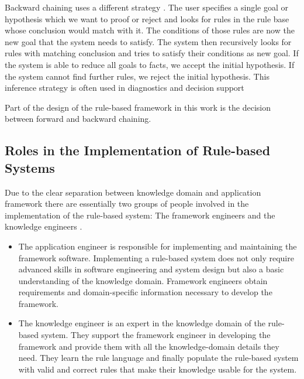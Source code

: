 Backward chaining uses a different strategy \cite{al2015comparison}.
The user specifies a single goal or hypothesis
which we want to proof or reject and looks for rules in the rule base whose conclusion would match with it.
The conditions of those rules are now the new goal that the system needs to satisfy.
The system then recursively looks for rules with matching conclusion
and tries to satisfy their conditions as new goal.
If the system is able to reduce all goals to facts, we accept the initial hypothesis.
If the system cannot find further rules, we reject the initial hypothesis.
This inference strategy is often used in diagnostics and decision support \cite{https://doi.org/10.1002/widm.11}

Part of the design of the rule-based framework in this work is the decision between forward and backward chaining.


\subsection{Roles in the Implementation of Rule-based Systems}\label{subsec:roles-in-the-implementation-of-rule-based-systems}
Due to the clear separation between knowledge domain and application framework there are essentially two groups of people
involved in the implementation of the rule-based system:
The framework engineers and the knowledge engineers \cite{jacob1990software}.
\begin{itemize}
    \item The application engineer is responsible for implementing and maintaining the framework software.
    Implementing a rule-based system does not only require advanced skills in software engineering and system design but also a basic understanding of the knowledge domain.
    Framework engineers obtain requirements and domain-specific information necessary to develop the framework.
    \item The knowledge engineer is an expert in the knowledge domain of the rule-based system.
    They support the framework engineer in developing the framework and provide them with all the knowledge-domain details they need.
    They learn the rule language and finally populate the rule-based system with valid and correct rules that make their knowledge usable for the system.
\end{itemize}
